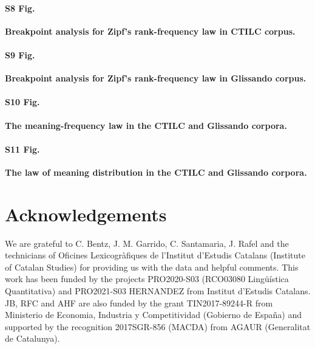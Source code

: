 \documentclass[10pt,letterpaper]{article}
\begin{document}
\paragraph*{S8 Fig.}
\label{S8_Fig}

\textbf{Breakpoint analysis for Zipf's rank-frequency law in CTILC corpus.} %

\paragraph*{S9 Fig.}
\label{S9_Fig}

\textbf{Breakpoint analysis for Zipf's rank-frequency law in Glissando corpus.} %

\paragraph*{S10 Fig.}
\label{S10_Fig}

\textbf{The meaning-frequency law in the CTILC and Glissando corpora.} %

\paragraph*{S11 Fig.}
\label{S11_Fig}

\textbf{The law of meaning distribution in the CTILC and Glissando corpora.} %

\fi	

\section*{Acknowledgements}

We are grateful to C. Bentz, J. M. Garrido, C. Santamaria, J. Rafel
and the technicians of Oficines Lexicogràfiques de 
l'Institut d'Estudis Catalans (Institute of Catalan Studies) for providing us with the data 
and helpful comments. This work has been funded by the projects PRO2020-S03 (RCO03080 Lin\-güís\-ti\-ca Quantitativa) and PRO2021-S03 HERNANDEZ from Institut d'Estudis Catalans. JB, RFC and AHF are also funded by the grant TIN2017-89244-R from Ministerio de Economia, Industria y Competitividad (Gobierno de España) and supported by the recognition 2017SGR-856 (MACDA) from AGAUR
(Generalitat de Catalunya).

\end{document}
